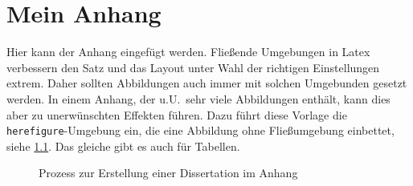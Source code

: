 

\chapter{Mein Anhang}
\label{sec:App_HS_Optimierung}

Hier kann der Anhang eingefügt werden. Fließende Umgebungen in Latex verbessern den Satz und das Layout unter Wahl der richtigen Einstellungen extrem. Daher sollten Abbildungen auch immer mit solchen Umgebunden gesetzt werden. In einem Anhang, der u.U.\ sehr viele Abbildungen enthält, kann dies aber zu unerwünschten Effekten führen. Dazu führt diese Vorlage die \texttt{herefigure}-Umgebung ein, die eine Abbildung ohne Fließumgebung einbettet, siehe \cref{img:DissertationsprozessOhneFliessumgebung}. Das gleiche gibt es auch für Tabellen.

\begin{figure}[hbt]
	\centering
	\caption[Kurzunterschrift für Abbildungsverzeichnis]{Prozess zur Erstellung einer Dissertation im Anhang}
	\label{img:DissertationsprozessOhneFliessumgebung}
\end{figure}
